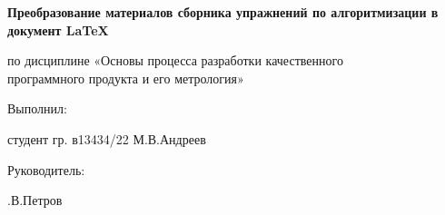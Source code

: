 \documentclass[12pt]{article}
\begin{document}
\begin{titlepage}
\vspace{\baselineskip}
\begin{Center}
{\fontsize{14pt}{16.8pt}\selectfont \textbf{Преобразование материалов сборника упражнений по алгоритмизации в документ LaTeX}\par}
\end{Center}\par

\begin{Center}
{\fontsize{14pt}{16.8pt}\selectfont по дисциплине «Основы процесса разработки качественного \\программного продукта и его метрология»\par}
\end{Center}\par


\vspace{\baselineskip}

\vspace{\baselineskip}

\vspace{\baselineskip}

\vspace{\baselineskip}

\vspace{\baselineskip}


\begin{adjustwidth}{0.39in}{0.0in}
{\fontsize{14pt}{16.8pt}\selectfont Выполнил:\par}\par

\end{adjustwidth}

\begin{adjustwidth}{0.39in}{0.0in}
{\fontsize{14pt}{16.8pt}\selectfont студент гр. в13434/22 \tabto{2.75in}  \tabto{5in} М.В.Андреев\\[0.5mm]\par}\par

\end{adjustwidth}

\begin{adjustwidth}{0.39in}{0.0in}
{\fontsize{14pt}{16.8pt}\selectfont Руководитель:\par}\par

\end{adjustwidth}

\begin{adjustwidth}{0.39in}{0.0in}
{\fontsize{14pt}{16.8pt}  \tabto{5in} .В.Петров\par}\par


\end{adjustwidth}
\end{titlepage}
\end{document}

